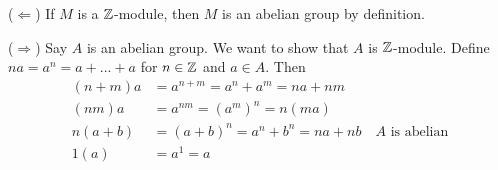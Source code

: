 ($\Leftarrow$) If $M$ is a $\Bbb Z$-module, then $M$ is an abelian group by definition.

($\Rightarrow$) Say $A$ is an abelian group. We want to show that $A$ is $\Bbb Z$-module. Define $na = a^n = a + ... +a$ for $n\in \Bbb Z$ and $a \in A$. Then 
\begin{align}
(n+m)a &= a^{n+m}=a^n+a^m= na + nm \\
(nm)a &= a^{nm} = (a^{m})^n = n(ma) \\
n(a+b) &= (a+b)^n = a^n + b^n = na + nb \quad \text{$A$ is abelian} \\
1(a) &= a^1 = a
\end{align}
